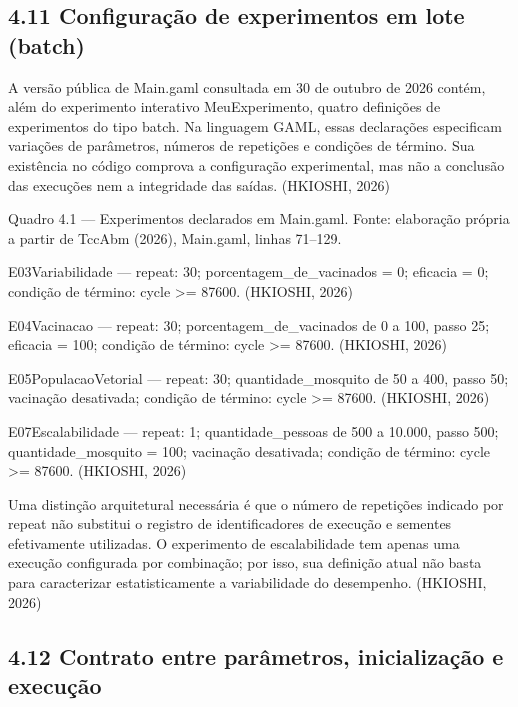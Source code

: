 \subsection{4.11 Configuração de experimentos em lote
(batch)}\label{configurauxe7uxe3o-de-experimentos-em-lote-batch}

A versão pública de Main.gaml consultada em 30 de outubro de 2026
contém, além do experimento interativo MeuExperimento, quatro definições
de experimentos do tipo batch. Na linguagem GAML, essas declarações
especificam variações de parâmetros, números de repetições e condições
de término. Sua existência no código comprova a configuração
experimental, mas não a conclusão das execuções nem a integridade das
saídas. (HKIOSHI, 2026)

Quadro 4.1 --- Experimentos declarados em Main.gaml. Fonte: elaboração
própria a partir de TccAbm (2026), Main.gaml, linhas 71--129.

E03Variabilidade --- repeat: 30; porcentagem\_de\_vacinados = 0;
eficacia = 0; condição de término: cycle \textgreater= 87600. (HKIOSHI,
2026)

E04Vacinacao --- repeat: 30; porcentagem\_de\_vacinados de 0 a 100,
passo 25; eficacia = 100; condição de término: cycle \textgreater=
87600. (HKIOSHI, 2026)

E05PopulacaoVetorial --- repeat: 30; quantidade\_mosquito de 50 a 400,
passo 50; vacinação desativada; condição de término: cycle \textgreater=
87600. (HKIOSHI, 2026)

E07Escalabilidade --- repeat: 1; quantidade\_pessoas de 500 a 10.000,
passo 500; quantidade\_mosquito = 100; vacinação desativada; condição de
término: cycle \textgreater= 87600. (HKIOSHI, 2026)

Uma distinção arquitetural necessária é que o número de repetições
indicado por repeat não substitui o registro de identificadores de
execução e sementes efetivamente utilizadas. O experimento de
escalabilidade tem apenas uma execução configurada por combinação; por
isso, sua definição atual não basta para caracterizar estatisticamente a
variabilidade do desempenho. (HKIOSHI, 2026)

\subsection{4.12 Contrato entre parâmetros, inicialização e
execução}\label{contrato-entre-paruxe2metros-inicializauxe7uxe3o-e-execuuxe7uxe3o}

